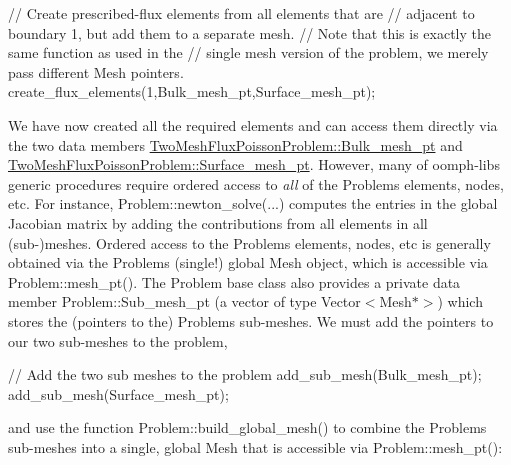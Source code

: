 \begin{DoxyCodeInclude}
 \textcolor{comment}{// Create prescribed-flux elements from all elements that are }
 \textcolor{comment}{// adjacent to boundary 1, but add them to a separate mesh.}
 \textcolor{comment}{// Note that this is exactly the same function as used in the }
 \textcolor{comment}{// single mesh version of the problem, we merely pass different Mesh pointers.}
 create\_flux\_elements(1,Bulk\_mesh\_pt,Surface\_mesh\_pt);

\end{DoxyCodeInclude}


We have now created all the required elements and can access them directly via the two data members {\ttfamily \hyperlink{classTwoMeshFluxPoissonProblem_abd0718261b6c8586d5de35cfef2292d8}{Two\+Mesh\+Flux\+Poisson\+Problem\+::\+Bulk\+\_\+mesh\+\_\+pt}} and {\ttfamily \hyperlink{classTwoMeshFluxPoissonProblem_a96b1ff6102eceb5ce432ac9197f68283}{Two\+Mesh\+Flux\+Poisson\+Problem\+::\+Surface\+\_\+mesh\+\_\+pt}}. However, many of {\ttfamily oomph-\/lib\textquotesingle{}s} generic procedures require ordered access to {\itshape all} of the {\ttfamily Problem\textquotesingle{}s} elements, nodes, etc. For instance, {\ttfamily Problem\+::newton\+\_\+solve}(...) computes the entries in the global Jacobian matrix by adding the contributions from all elements in all (sub-\/)meshes. Ordered access to the {\ttfamily Problem\textquotesingle{}s} elements, nodes, etc is generally obtained via the {\ttfamily Problem\textquotesingle{}s} (single!) global {\ttfamily Mesh} object, which is accessible via {\ttfamily Problem\+::mesh\+\_\+pt()}. The {\ttfamily Problem} base class also provides a private data member {\ttfamily Problem\+::\+Sub\+\_\+mesh\+\_\+pt} (a vector of type {\ttfamily Vector$<$\+Mesh$\ast$$>$}) which stores the (pointers to the) {\ttfamily Problem\textquotesingle{}s} sub-\/meshes. We must add the pointers to our two sub-\/meshes to the problem,


\begin{DoxyCodeInclude}
 \textcolor{comment}{// Add the two sub meshes to the problem}
 add\_sub\_mesh(Bulk\_mesh\_pt);
 add\_sub\_mesh(Surface\_mesh\_pt);

\end{DoxyCodeInclude}


and use the function {\ttfamily Problem\+::build\+\_\+global\+\_\+mesh()} to combine the {\ttfamily Problem\textquotesingle{}s} sub-\/meshes into a single, global {\ttfamily Mesh} that is accessible via {\ttfamily Problem\+::mesh\+\_\+pt()}\+:


